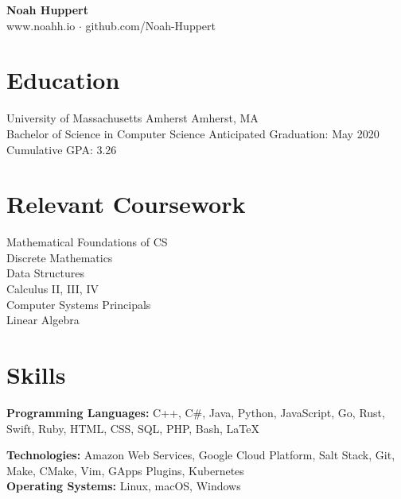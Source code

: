 \documentclass[10pt]{article}
\begin{document}

\centering
	\textbf{Noah Huppert} \\
	
	www.noahh.io $\cdot$ github.com/Noah-Huppert


\begin{flushleft}

\section{Education}
	University of Massachusetts Amherst \hfill Amherst, MA \\
	Bachelor of Science in Computer Science \hfill Anticipated Graduation: May 2020 \\
	Cumulative GPA: 3.26

\section{Relevant Coursework}
	\begin{addmargin}[1em]{1em}
	\begin{multicols}{3}
		Mathematical Foundations of CS \\
		Discrete Mathematics \\

		Data Structures \\
		Calculus II, III, IV \\

		Computer Systems Principals \\
		Linear Algebra 
	\end{multicols} 
	\end{addmargin}


\section{Skills}
	\textbf{Programming Languages:} C++, C\#, Java, Python, JavaScript, Go, Rust, Swift, Ruby, HTML, CSS, SQL, PHP,
		Bash, LaTeX

	\textbf{Technologies:} Amazon Web Services, Google Cloud Platform, Salt Stack, Git, Make, CMake, Vim,
		GApps Plugins, Kubernetes \\

	\textbf{Operating Systems:} Linux, macOS, Windows


\end{flushleft}
\end{document}
